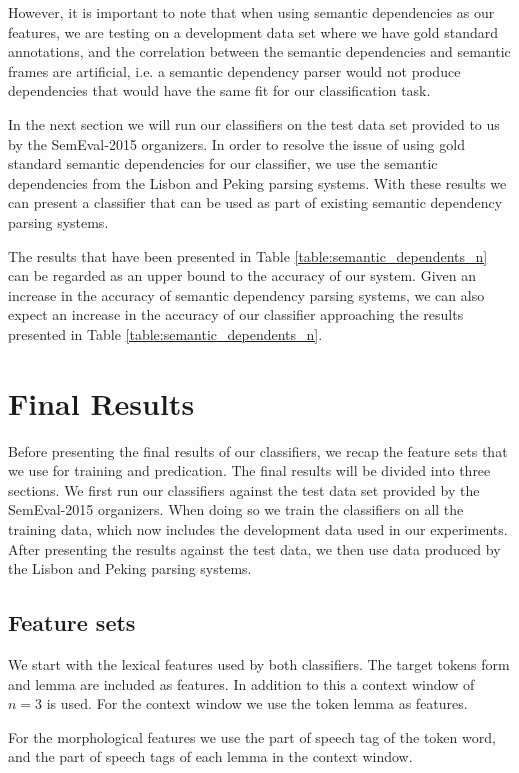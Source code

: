However, it is important to note that when using semantic dependencies as our features, we are testing on a development data set where we have gold standard annotations, and the correlation between the semantic dependencies and semantic frames are artificial, i.e. a semantic dependency parser would not produce dependencies that would have the same fit for our classification task. 

In the next section we will run our classifiers on the test data set provided to us by the SemEval-2015 organizers. In order to resolve the issue of using gold standard semantic dependencies for our classifier, we use the semantic dependencies from the Lisbon and Peking parsing systems. With these results we can present a classifier that can be used as part of existing semantic dependency parsing systems. 

The results that have been presented in Table \ref{table:semantic_dependents_n} can be regarded as an upper bound to the accuracy of our system. Given an increase in the accuracy of semantic dependency parsing systems, we can also expect an increase in the accuracy of our classifier approaching the results presented in Table \ref{table:semantic_dependents_n}. 


\section{Final Results}
\label{results_final}

Before presenting the final results of our classifiers, we recap the feature sets that we use for training and predication. The final results will be divided into three sections. We first run our classifiers against the test data set provided by the SemEval-2015 organizers. When doing so we train the classifiers on all the training data, which now includes the development data used in our experiments. After presenting the results against the test data, we then use data produced by the Lisbon and Peking parsing systems. 

\subsection{Feature sets}

We start with the lexical features used by both classifiers. The target tokens form and lemma are included as features. In addition to this a context window of $n=3$ is used. For the context window we use the token lemma as features.

For the morphological features we use the part of speech tag of the token word, and the part of speech tags of each lemma in the context window.

